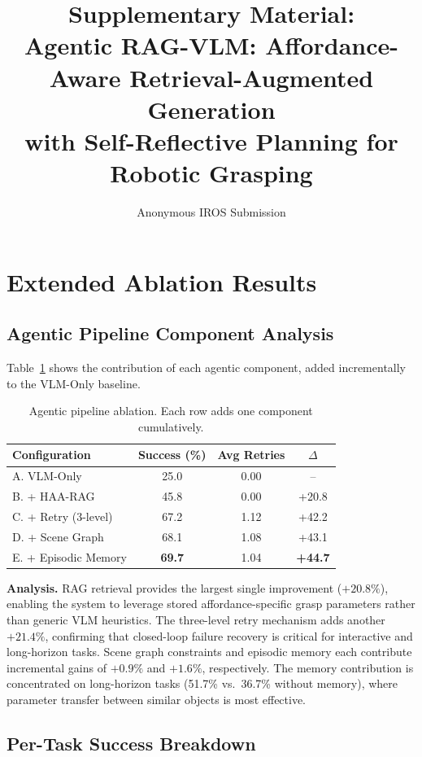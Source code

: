 \documentclass[letterpaper, 10pt]{article}
\title{Supplementary Material:\\Agentic RAG-VLM: Affordance-Aware Retrieval-Augmented Generation\\with Self-Reflective Planning for Robotic Grasping}
\author{Anonymous IROS Submission}
\begin{document}
\maketitle

\section{Extended Ablation Results}

\subsection{Agentic Pipeline Component Analysis}

Table~\ref{tab:agentic_ablation} shows the contribution of each agentic component, added incrementally to the VLM-Only baseline.

\begin{table}[h]
\centering
\caption{Agentic pipeline ablation. Each row adds one component cumulatively.}
\label{tab:agentic_ablation}
\begin{tabular}{@{}lccc@{}}
\toprule
\textbf{Configuration} & \textbf{Success (\%)} & \textbf{Avg Retries} & $\Delta$ \\
\midrule
A. VLM-Only & 25.0 & 0.00 & -- \\
B. + HAA-RAG & 45.8 & 0.00 & +20.8 \\
C. + Retry (3-level) & 67.2 & 1.12 & +42.2 \\
D. + Scene Graph & 68.1 & 1.08 & +43.1 \\
E. + Episodic Memory & \textbf{69.7} & 1.04 & \textbf{+44.7} \\
\bottomrule
\end{tabular}
\end{table}

\textbf{Analysis.} RAG retrieval provides the largest single improvement ($+20.8\%$), enabling the system to leverage stored affordance-specific grasp parameters rather than generic VLM heuristics.
The three-level retry mechanism adds another $+21.4\%$, confirming that closed-loop failure recovery is critical for interactive and long-horizon tasks.
Scene graph constraints and episodic memory each contribute incremental gains of $+0.9\%$ and $+1.6\%$, respectively.
The memory contribution is concentrated on long-horizon tasks (51.7\% vs.\ 36.7\% without memory), where parameter transfer between similar objects is most effective.

\subsection{Per-Task Success Breakdown}
\end{document}
